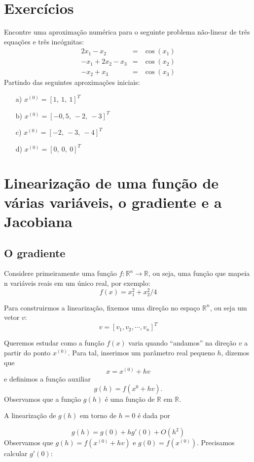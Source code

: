 \documentclass[main.tex]{subfiles}
\begin{document}
\section*{Exercícios}

\begin{Exercise} Encontre uma aproximação numérica para o seguinte problema não-linear de três equações e três incógnitas:
\begin{eqnarray*}
2x_1-x_2&=&\cos(x_1)\\
-x_1+2x_2-x_3&=&\cos(x_2)\\
-x_2+	x_3&=&\cos(x_3)
\end{eqnarray*}
Partindo das seguintes aproximações iniciais:
\begin{itemize}
\item[a)] $x^{(0)}=[1,~1,~1]^T$
\item[b)] $x^{(0)}=[-0,5,~-2,~-3]^T$
\item[c)] $x^{(0)}=[-2,~-3,~-4]^T$
\item[d)] $x^{(0)}=[0,~0,~0]^T$
\end{itemize}
\end{Exercise}


\section{Linearização de uma função de várias variáveis, o gradiente e a Jacobiana}

\subsection{O gradiente}

Considere primeiramente uma função $f:\mathbb{R}^n\to \mathbb{R}$, ou seja, uma função que mapeia n variáveis reais em um único real, por exemplo:
$$f(x)=x_1^2+x_2^2/4$$

Para construirmos a linearização, fixemos uma direção no espaço $\mathbb{R}^n$, ou seja um vetor $v$:
$$v=[v_1,  v_2,  \cdots,  v_n]^T$$

Queremos estudar como a função $f(x)$ varia quando ``andamos'' na direção $v$ a partir do ponto $x^{(0)}$. Para tal, inserimos um parâmetro  real pequeno $h$, dizemos que $$x=x^{(0)}+hv$$ e definimos a função auxiliar
$$g(h)=f(x^{0}+hv).$$
Observamos que a função $g(h)$ é uma função de $\mathbb{R}$ em $\mathbb{R}$.



A linearização de $g(h)$ em torno de $h=0$ é dada por

$$g(h)=g(0) + hg'(0) +O(h^2)$$
Observamos que $g(h)=f(x^{(0)}+hv)$ e $g(0)=f(x^{(0)})$. Precisamos calcular $g'(0)$:
\end{document}
